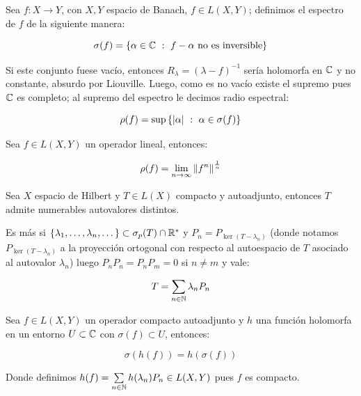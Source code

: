 \begin{definition}
	Sea $f : X \rightarrow Y$, con $X,Y$ espacio de Banach, $f \in L(X,Y)$; definimos el espectro de $f$ de la siguiente manera:
	
	\begin{equation*}
		\sigma(f) = \left\lbrace\alpha \in \mathbb{C} ~:~ f- \alpha \text{ no es inversible}\right\rbrace
	\end{equation*}
	
	Si este conjunto fuese vac\'io, entonces $R_{\lambda} = \left(\lambda -f\right)^{-1}$ ser\'ia holomorfa en $\mathbb{C}$ y no constante, absurdo por Liouville. Luego, como es no vac\'io existe el supremo pues $\mathbb{C}$ es completo; al supremo del espectro le decimos radio espectral:
	
	\begin{equation*}
	\rho(f) = \sup \left\lbrace\left\lvert\alpha\right\rvert ~:~ \alpha \in \sigma(f)\right\rbrace
	\end{equation*}
	
\end{definition}

\begin{proposition}
	\label{prop: teorema de gelfand}
	Sea $f \in L(X,Y)$ un operador lineal, entonces:
	
	\begin{equation*}
		\rho(f) = \lim\limits_{n \to \infty} \left\lVert f^n\right\rVert^{\frac{1}{n}}
	\end{equation*}
	
\end{proposition}

\begin{theorem}
	Sea $X$ espacio de Hilbert y $T \in L(X)$ compacto y autoadjunto, entonces $T$ admite numerables autovalores distintos. 
	
	Es m\'as si $\left\lbrace\lambda_1, \dots, \lambda_n, \dots\right\rbrace \subset \sigma_p(T) \cap {\mathbb{R}}^{\ast}$ y $P_n = P_{\ker(T-\lambda_n)}$ (donde notamos $P_{\ker(T-\lambda_n)}$ a la proyecci\'on ortogonal con respecto al autoespacio de $T$ asociado al autovalor $\lambda_n$) luego $P_nP_n = P_nP_m = 0$ si $n \neq m$ y vale:
	
	\begin{equation}
	\label{eq: Teorema espectral}
	T = \sum\limits_{n \in {\mathbb{N}}}{\lambda_n P_n}
	\end{equation}
\end{theorem}

\begin{proposition}
	\label{prop: calculo funcional}
	
	Sea $f \in L(X,Y)$ un operador compacto autoadjunto y $h$ una funci\'on holomorfa en un entorno $U \subset \mathbb{C}$ con $\sigma(f) \subset U$, entonces:
	
	\begin{equation*}
		\sigma \left(h(f)\right) = h(\sigma(f))
	\end{equation*}
	
	Donde definimos $h(f) = \sum\limits_{n \in {\mathbb{N}}}{h(\lambda_n) P_n} \in L(X,Y)$ pues $f$ es compacto.
	
\end{proposition}


